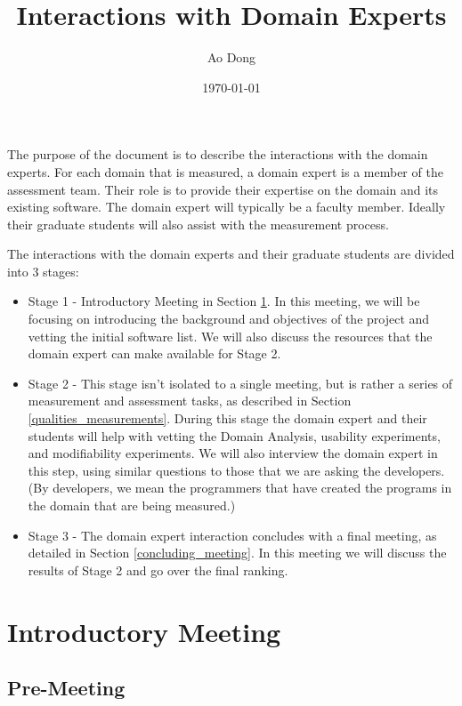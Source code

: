 \documentclass[12pt]{article}
\title{Interactions with Domain Experts}
\author{Ao Dong}
\date{\today}
\begin{document}
\maketitle

The purpose of the document is to describe the interactions with the domain
experts.  For each domain that is measured, a domain expert is a member of the
assessment team.  Their role is to provide their expertise on the domain and its
existing software.   The domain expert will typically be a faculty member.
Ideally their graduate students will also assist with the measurement process.

The interactions with the domain experts and their graduate students are divided
into 3 stages:

\begin{itemize}
\item Stage 1 - Introductory Meeting in Section \ref{introductory_meeting}. In
this meeting, we will be focusing on introducing the background and objectives
of the project and vetting the initial software list.  We will also discuss the
resources that the domain expert can make available for Stage 2.
\item Stage 2 - This stage isn't isolated to a single meeting, but is rather a
  series of measurement and assessment tasks, as described in Section
  \ref{qualities_measurements}.  During this stage the domain expert and their
  students will help with vetting the Domain Analysis, usability
  experiments, and modifiability experiments.  We will also interview the domain
  expert in this step, using similar questions to those that we are asking the
  developers.  (By developers, we mean the programmers that have created the
  programs in the domain that are being measured.)
\item Stage 3 - The domain expert interaction concludes with a final meeting, as
  detailed in Section \ref{concluding_meeting}.  In this meeting we will discuss
  the results of Stage 2 and go over the final ranking.
\end{itemize}

\section{Introductory Meeting} \label{introductory_meeting}

\subsection{Pre-Meeting}
\end{document}
